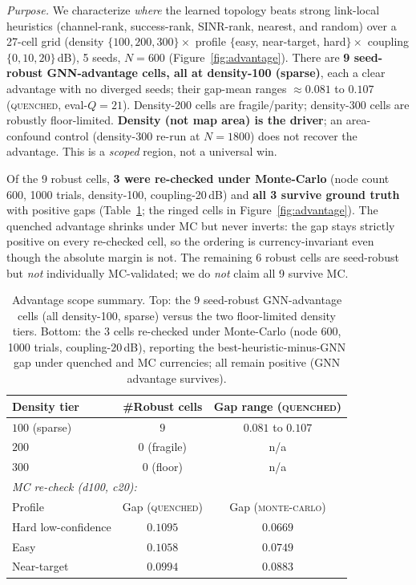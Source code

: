 \documentclass[journal]{IEEEtran}
\newcommand{\qq}{\textsc{quenched}}
\newcommand{\mc}{\textsc{monte-carlo}}
\begin{document}
\emph{Purpose.} We characterize \emph{where} the learned topology beats strong
link-local heuristics (channel-rank, success-rank, SINR-rank, nearest, and
random) over a
27-cell grid (density $\{100,200,300\}\times$ profile $\{$easy, near-target, hard$\}
\times$ coupling $\{0,10,20\}$\,dB), 5 seeds, $N{=}600$
(Figure~\ref{fig:advantage}). There are \textbf{9 seed-robust GNN-advantage
cells, all at density-100 (sparse)}, each a clear advantage with no diverged
seeds; their gap-mean ranges
$\approx0.081$ to $0.107$ (\qq{}, eval-$Q{=}21$). Density-200 cells are
fragile/parity; density-300 cells are robustly floor-limited. \textbf{Density
(not map area) is the driver}; an area-confound control (density-300 re-run at
$N{=}1800$) does not recover the advantage. This is a \emph{scoped} region, not a
universal win.

Of the 9 robust cells, \textbf{3 were re-checked under Monte-Carlo} (node count
600, 1000 trials, density-100, coupling-20\,dB) and \textbf{all 3 survive ground
truth} with positive gaps (Table~\ref{tab:advantage}; the ringed cells in
Figure~\ref{fig:advantage}). The quenched advantage shrinks under MC but
never inverts: the gap stays strictly positive on every re-checked cell, so the
ordering is currency-invariant even though the absolute margin is not. The
remaining 6 robust cells are seed-robust but \emph{not} individually
MC-validated; we do \emph{not} claim all 9 survive MC.

\begin{table}[t]
  \centering
  \caption{Advantage scope summary. Top: the 9 seed-robust GNN-advantage cells
  (all density-100, sparse) versus the two floor-limited density tiers. Bottom:
  the 3 cells re-checked under Monte-Carlo (node 600, 1000 trials,
  coupling-20\,dB), reporting the best-heuristic-minus-GNN gap under quenched and
  MC currencies; all remain positive (GNN advantage survives).}
  \label{tab:advantage}
  \small
  \setlength{\tabcolsep}{4pt}
  \begin{tabular}{lcc}
    \toprule
    Density tier & \#Robust cells & Gap range (\qq{}) \\
    \midrule
    $100$ (sparse) & $9$         & $0.081$ to $0.107$ \\
    $200$          & $0$ (fragile) & n/a \\
    $300$          & $0$ (floor)   & n/a \\
    \midrule
    \multicolumn{3}{l}{\emph{MC re-check (d100, c20):}}\\
    Profile & Gap (\qq{}) & Gap (\mc{}) \\
    \midrule
    Hard low-confidence & $0.1095$ & $0.0669$ \\
    Easy                & $0.1058$ & $0.0749$ \\
    Near-target         & $0.0994$ & $0.0883$ \\
    \bottomrule
  \end{tabular}
\end{table}
\end{document}
